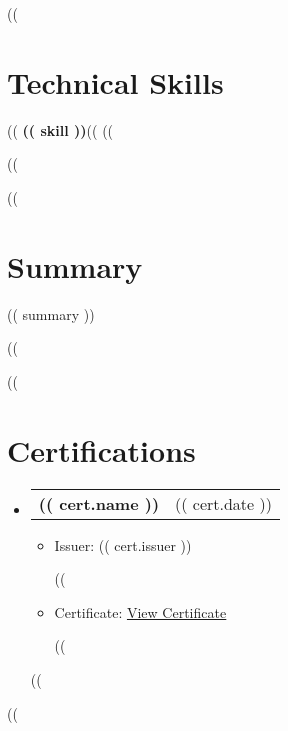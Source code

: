 \documentclass[letterpaper,11pt]{article}
\makeatletter
\newcommand{\resumeItem}[1]{
  \item\small{
    {#1 \vspace{-2pt}}
  }
}
\newcommand{\resumeProjectHeading}[2]{
    \item
    \begin{tabular*}{0.97\textwidth}{l@{\extracolsep{\fill}}r}
      \small#1 & #2 \\
    \end{tabular*}\vspace{-7pt}
}
\newcommand{\resumeSubHeadingListStart}{\begin{itemize}[leftmargin=0.15in, label={}]}
\newcommand{\resumeSubHeadingListEnd}{\end{itemize}}
\newcommand{\resumeItemListStart}{\begin{itemize}}
\newcommand{\resumeItemListEnd}{\end{itemize}\vspace{-5pt}}
\makeatother
\begin{document}
((%
\section{Technical Skills}
 \begin{itemize}[leftmargin=0.15in, label={}]
    \small{\item{
     ((%
     \textbf{(( skill ))}((%
     ((%
    }}
 \end{itemize}
((%

((%
\section{Summary}
\begin{itemize}[leftmargin=0.15in, label={}]
    \small{\item{
        (( summary ))
    }}
\end{itemize}
((%

((%
\section{Certifications}
    \resumeSubHeadingListStart
      ((%
      \resumeProjectHeading
          {\textbf{(( cert.name ))}}{(( cert.date ))}
          \resumeItemListStart
            \resumeItem{Issuer: (( cert.issuer ))}
            ((%
            \resumeItem{Certificate: \href{(( cert.link ))}{\underline{View Certificate}}}
            ((%
          \resumeItemListEnd
      ((%
    \resumeSubHeadingListEnd
((%
\end{document}
